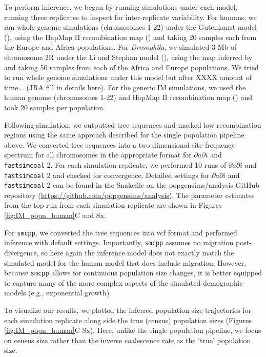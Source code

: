 \documentclass[12pt,halfline,a4paper]{ouparticle}
\newcommand{\dadi}{$\partial a \partial i$\xspace}
\newcommand{\smcpp}{\texttt{smcpp}\xspace}
\newcommand{\fastsimcoal}{\texttt{fastsimcoal}\xspace}
\begin{document}
To perform inference, we began by running simulations under each model, running
three replicates to inspect for inter-replicate variability. For humans, we ran
whole genome simulations (chromosomes 1-22) under the Gutenkunst model (\cite{gutenkunst2009inferring}),
using the HapMap II recombination map (\cite{international2007second}) and taking 20
samples each from the Europe and Africa populations. For \emph{Drosophila},
we simulated 3 Mb of chromosome 2R under the Li and Stephan model (\cite{li2006inferring}),
using the map inferred by \cite{comeron2012many} and taking 50 samples from each of
the Africa and Europe populations. We tried to run whole genome simulations under
this model but after XXXX amount of time... (JRA fill in details here). For the generic
IM simulations, we used the human genome (chromosomes 1-22) and HapMap II recombination
map (\cite{international2007second}) and took 20 samples per population.

Following simulation, we outputted tree sequences and masked low recombination
regions using the same approach described for the single population pipeline above. We
converted tree sequences into a two dimensional site frequency spectrum for all
chromosomes in the appropriate format for \dadi and \fastsimcoal2. For each simulation
replicate, we performed 10 runs of \dadi and \fastsimcoal2 and checked for convergence.
Detailed settings for \dadi and \fastsimcoal2 can be found in the Snakefile
on the popgensims/analysis GitHub repository (\url{https://github.com/popgensims/analysis}).
The parameter estimates from the top run from each simulation replicate
are shown in Figures \ref{fig:IM_popn_human}C and Sx.

For \smcpp , we converted the tree sequences into vcf format and performed inference
with default settings. Importantly, \smcpp assumes no migration post-divergence, so
here again the inference model does not exactly match the simulated model for the
human model that does include migration. However, because \smcpp allows
for continuous population size changes, it is better equipped to capture many of the
more complex aspects of the simulated demographic models (e.g., exponential growth).

To visualize our results, we plotted the inferred population size trajectories
for each simulation replicate along side the true (census) population sizes
(Figures \ref{fig:IM_popn_human}C Sx). Here, unlike the single population pipeline,
we focus on census size rather than the inverse coalescence rate as the `true' population size.
\end{document}
